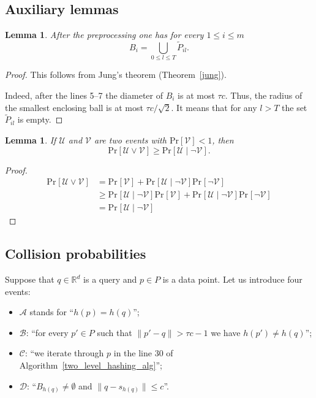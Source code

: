 \documentclass[11pt,letterpaper]{article}
\newtheorem{lemma}[theorem]{Lemma}
\newcommand{\Prb}[2]{\mathrm{Pr}_{#1}\left[#2\right]}
\newcommand{\Rbb}{\mathbb{R}}
\newcommand{\Uc}{\mathcal{U}}
\newcommand{\Vc}{\mathcal{V}}
\begin{document}
\subsection*{Auxiliary lemmas}

\begin{lemma}
    \label{form_partition}
    After the preprocessing one has for every $1 \leq i \leq m$
    $$
        B_i = \bigcup_{0 \leq l \leq T} \widetilde{P}_{il}.
    $$
\end{lemma}
\begin{proof}
    This follows from Jung's theorem (Theorem~\ref{jung}). 

    Indeed, after the lines 5--7 the diameter of $B_i$ is at most $\tau c$.
    Thus, the radius of the smallest enclosing ball is at most $\tau c / \sqrt{2}$.
    It means that for any $l > T$ the set $\widetilde{P}_{il}$ is empty.
\end{proof}

\begin{lemma}
    \label{prob_ineq}
    If $\mathcal{U}$ and $\mathcal{V}$ are two events
    with $\mathrm{Pr}[\mathcal{V}] < 1$, then
    $$
        \mathrm{Pr}[\mathcal{U} \vee \mathcal{V}] \geq \mathrm{Pr}[\mathcal{U} \mid \neg \mathcal{V}].
    $$
\end{lemma}
\begin{proof}
    \begin{align*}
        \Prb{}{\Uc \vee \Vc} &= \Prb{}{\Vc} + \Prb{}{\Uc \mid \neg \Vc} \Prb{}{\neg \Vc}\\
        &\ge  \Prb{}{\Uc \mid \neg \Vc}  \Prb{}{\Vc} + \Prb{}{\Uc \mid \neg \Vc} \Prb{}{\neg \Vc}\\
        &=\Prb{}{\Uc \mid \neg \Vc}
    \end{align*}
\end{proof}

\subsection*{Collision probabilities}

Suppose that $q \in \Rbb^d$ is a query and $p \in P$ is a data point.
Let us introduce four events:
\begin{itemize}
    \item $\mathcal{A}$ stands for ``$h(p) = h(q)$'';
    \item $\mathcal{B}$: ``for every $p' \in P$ such that $\|p' - q\| > \tau c - 1$ we have $h(p') \ne h(q)$'';
    \item $\mathcal{C}$: ``we iterate through $p$ in the line 30 of Algorithm~\ref{two_level_hashing_alg}'';
    \item $\mathcal{D}$: ``$B_{h(q)} \ne \emptyset$ and $\|q - s_{h(q)}\| \leq c$''.
\end{itemize}
\end{document}
